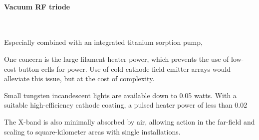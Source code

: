 \documentclass[paper.tex]{subfiles}
\begin{document}
\begin{multicols}{1}
\paragraph{\textbf{Vacuum RF triode}}\



Especially combined with an integrated titanium sorption pump,

One concern is the large filament heater power, which prevents the use of low-cost button cells for power. Use of cold-cathode field-emitter arrays would alleviate this issue, but at the cost of complexity.

Small tungsten incandescent lights are available down to 0.05 watts. With a suitable high-efficiency cathode coating, a pulsed heater power of less than 0.02



\end{multicols}


The X-band is also minimally absorbed by air, allowing action in the far-field and scaling to square-kilometer areas with single installations.




\clearpage
\end{document}
